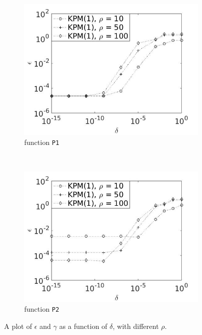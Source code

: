 \begin{figure}[H]
        \begin{subfigure}[b]{0.45\textwidth}
                \includegraphics[width=\textwidth]{fig/s15errvstol1m}
                \caption{function \texttt{P1}}
                \label{fig:errtol1}
        \end{subfigure}
~
        \begin{subfigure}[b]{0.45\textwidth}
                \includegraphics[width=\textwidth]{fig/s16errvstol2m}
                \caption{ function \texttt{P2}}
                \label{fig:errtol2}
        \end{subfigure}
        
        \caption{A plot of $\epsilon$ and $\gamma$ as a function of $\delta$, with different $\rho$.} \label{fig:errant}
\end{figure}
